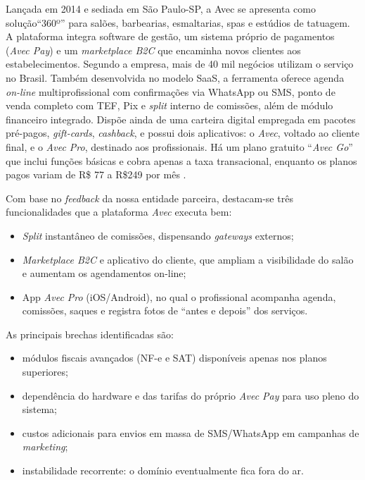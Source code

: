 Lançada em 2014 e sediada em São Paulo-SP, a Avec se apresenta como solução``360º'' para salões, barbearias, esmaltarias, spas e estúdios de tatuagem. A plataforma integra software de gestão, um sistema próprio de pagamentos (\emph{Avec Pay}) e um \emph{marketplace B2C} que encaminha novos clientes aos estabelecimentos. Segundo a empresa, mais de 40 mil negócios utilizam o serviço no
Brasil. Também desenvolvida no modelo SaaS, a ferramenta oferece agenda \emph{on-line} multiprofissional com confirmações via WhatsApp ou SMS, ponto de venda completo com TEF, Pix e \emph{split} interno de comissões, além de módulo financeiro integrado. Dispõe ainda de uma carteira digital empregada em pacotes pré-pagos, \emph{gift-cards}, \emph{cashback}, e possui dois aplicativos: o \emph{Avec}, voltado ao cliente final, e o \emph{Avec Pro}, destinado aos profissionais. Há um plano gratuito ``\emph{Avec Go}'' que inclui funções básicas e cobra apenas a taxa transacional, enquanto os planos pagos variam de R\$ 77 a
R\$249 por mês \cite{Avec}.


Com base no \emph{feedback} da nossa entidade parceira, destacam-se três funcionalidades que
a plataforma \emph{Avec} executa bem:
\begin{itemize}
	\item \emph{Split} instantâneo de comissões, dispensando \emph{gateways} externos;
	\item \emph{Marketplace B2C} e aplicativo do cliente, que ampliam a visibilidade do salão e aumentam os agendamentos on-line;
	\item App \emph{Avec Pro} (iOS/Android), no qual o profissional acompanha agenda,
	comissões, saques e registra fotos de “antes e depois” dos serviços.
\end{itemize}

As principais brechas identificadas são:
\begin{itemize}
	\item módulos fiscais avançados (NF-e e SAT) disponíveis apenas nos planos superiores;
	\item dependência do hardware e das tarifas do próprio \emph{Avec Pay} para uso pleno do sistema;
	\item custos adicionais para envios em massa de SMS/WhatsApp em campanhas de \emph{marketing};
	\item instabilidade recorrente: o domínio eventualmente fica fora do ar.
\end{itemize}


